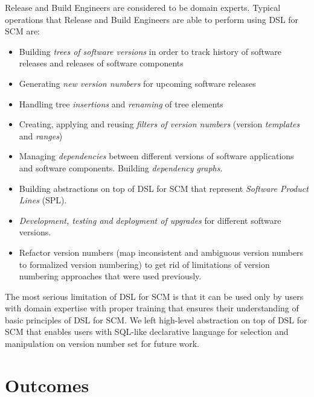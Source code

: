 \documentclass[11pt]{article}
\begin{document}
Release and Build Engineers are considered to be domain experts. Typical operations that Release and Build Engineers are able to perform using DSL for SCM are:
\begin{itemize}
\item Building \textit{trees of software versions} in order to track history of software releases and releases of software components 
\item Generating \textit{new version numbers} for upcoming software releases
\item Handling tree \textit{insertions} and \textit{renaming} of tree elements
\item Creating, applying and reusing \textit{filters of version numbers} (version \textit{templates} and \textit{ranges})
\item Managing \textit{dependencies} between different versions of software applications and software components. Building \textit{dependency graphs}.
\item Building abstractions on top of DSL for SCM that represent \textit{Software Product Lines} (SPL).
\item \textit{Development, testing and deployment of upgrades} for different software versions. 
\item Refactor version numbers (map inconsistent and ambiguous version numbers to formalized version numbering) to get rid of limitations of version numbering approaches that were used previously.
\end{itemize}



The most serious limitation of DSL for SCM is that it can be used only by users with domain expertise with proper training that ensures their understanding of basic principles of DSL for SCM. We left high-level abstraction on top of DSL for SCM that enables users with SQL-like declarative language for selection and manipulation on version number set for future work.

\section{Outcomes}
\label{sec:outcomes}
\end{document}
